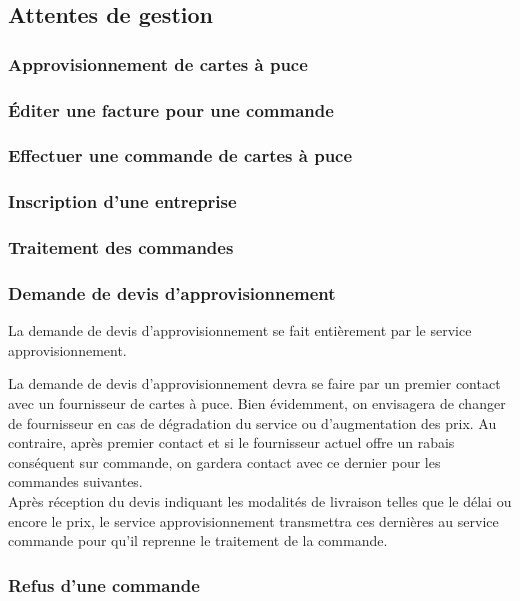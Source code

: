 

\subsection{Attentes de gestion}

\subsubsection{Approvisionnement de cartes à puce}
\subsubsection{Éditer une facture pour une commande}
\subsubsection{Effectuer une commande de cartes à puce}
\subsubsection{Inscription d'une entreprise}
\subsubsection{Traitement des commandes}

\subsubsection{Demande de devis d'approvisionnement}

La demande de devis d'approvisionnement se fait entièrement par le service
approvisionnement.

La demande de devis d'approvisionnement devra se faire par un premier
contact avec un fournisseur de cartes à puce. Bien évidemment, on
envisagera de changer de fournisseur en cas de dégradation du service ou
d'augmentation des prix. Au contraire, après premier contact et si le
fournisseur actuel offre un rabais conséquent sur commande, on gardera contact
avec ce dernier pour les commandes suivantes. \\

Après réception du devis indiquant les modalités de livraison telles que le
délai ou encore le prix, le service approvisionnement transmettra ces dernières
au service commande pour qu'il reprenne le traitement de la commande.

\subsubsection{Refus d'une commande}

